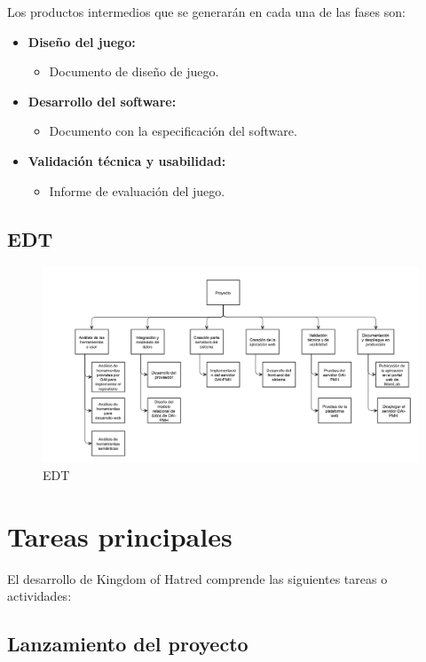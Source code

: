 Los productos intermedios que se generarán en cada una de las fases son:

\begin{itemize}
	\item \textbf{Diseño del juego:}
	\begin{itemize}
		\item Documento de diseño de juego.
	\end{itemize}
	\item \textbf{Desarrollo del software:}
	\begin{itemize}
		\item Documento con la especificación del software.
	\end{itemize}
	\item \textbf{Validación técnica y usabilidad:}
	\begin{itemize}
		\item Informe de evaluación del juego.
	\end{itemize}
\end{itemize}

\subsection{EDT}

\begin{figure}[!htp]
	\centering
	\includegraphics[angle=-90, scale=.5]{fig/edt}
	\caption{EDT}
\end{figure}

\section{Tareas principales}

El desarrollo de Kingdom of Hatred comprende las siguientes tareas o actividades:

\subsection{Lanzamiento del proyecto}

